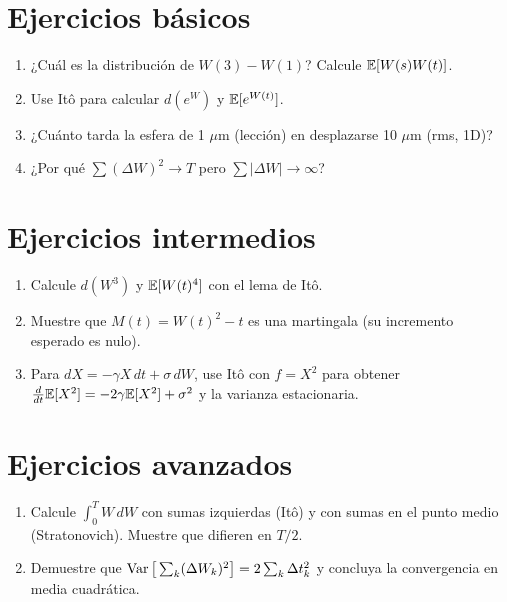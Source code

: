 \documentclass[11pt,a4paper]{article}
\begin{document}

\section{Ejercicios básicos}
\begin{enumerate}[label=\textbf{B\arabic*.}]
\item ¿Cuál es la distribución de $W(3)-W(1)$? Calcule $\mathbb{E}[W(s)W(t)]$.
\item Use Itô para calcular $d(e^{W})$ y $\mathbb{E}[e^{W(t)}]$.
\item ¿Cuánto tarda la esfera de 1 $\mu$m (lección) en desplazarse 10 $\mu$m (rms, 1D)?
\item ¿Por qué $\sum(\Delta W)^2\to T$ pero $\sum|\Delta W|\to\infty$?
\end{enumerate}

\section{Ejercicios intermedios}
\begin{enumerate}[label=\textbf{I\arabic*.}]
\item Calcule $d(W^3)$ y $\mathbb{E}[W(t)^4]$ con el lema de Itô.
\item Muestre que $M(t)=W(t)^2-t$ es una martingala (su incremento esperado es nulo).
\item Para $dX=-\gamma X\,dt+\sigma\,dW$, use Itô con $f=X^2$ para obtener $\frac{d}{dt}\mathbb{E}[X^2]=-2\gamma\mathbb{E}[X^2]+\sigma^2$ y la varianza estacionaria.
\end{enumerate}

\section{Ejercicios avanzados}
\begin{enumerate}[label=\textbf{A\arabic*.}]
\item Calcule $\int_0^TW\,dW$ con sumas izquierdas (Itô) y con sumas en el punto medio (Stratonovich). Muestre que difieren en $T/2$.
\item Demuestre que $\operatorname{Var}\big[\sum_k(\Delta W_k)^2\big]=2\sum_k\Delta t_k^2$ y concluya la convergencia en media cuadrática.
\end{enumerate}
\end{document}
